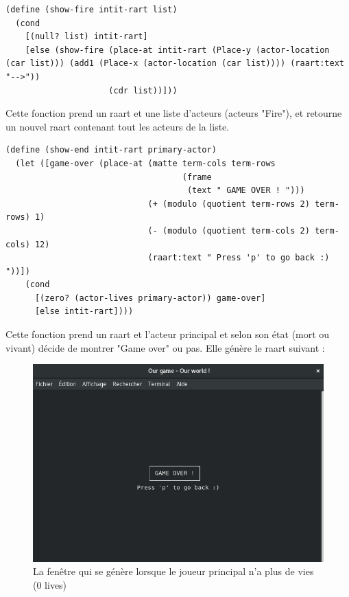 \documentclass[a4paper]{article}
\begin{document}
\begin{lstlisting}
(define (show-fire intit-rart list)
  (cond
    [(null? list) intit-rart]
    [else (show-fire (place-at intit-rart (Place-y (actor-location (car list))) (add1 (Place-x (actor-location (car list)))) (raart:text "-->"))
                     (cdr list))]))
\end{lstlisting}
Cette fonction prend un raart et une liste d'acteurs (acteurs "Fire"), et retourne un nouvel raart contenant tout les acteurs de la liste.

\begin{lstlisting}
(define (show-end intit-rart primary-actor)
  (let ([game-over (place-at (matte term-cols term-rows
                                    (frame
                                     (text " GAME OVER ! ")))
                             (+ (modulo (quotient term-rows 2) term-rows) 1) 
                             (- (modulo (quotient term-cols 2) term-cols) 12)       
                             (raart:text " Press 'p' to go back :) "))])
    (cond
      [(zero? (actor-lives primary-actor)) game-over]
      [else intit-rart])))
\end{lstlisting}
Cette fonction prend un raart et l'acteur principal et selon son état (mort ou vivant) décide de montrer "Game over" ou pas. Elle génère le raart suivant :
\begin{figure}[H]
    \centering
    \includegraphics[scale=0.3]{Pictures/game_over.png}
    \caption{La fenêtre qui se génère lorsque le joueur principal n'a plus de vies (0 lives)}
\end{figure}
\end{document}
